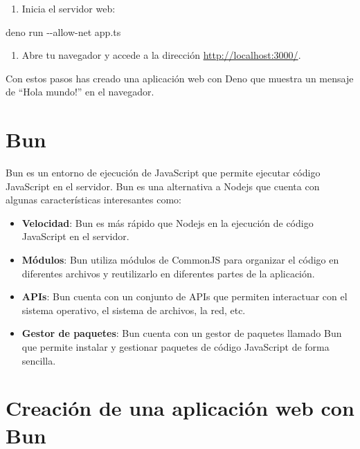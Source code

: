 \documentclass[
  a4paper,
  DIV=11,
  numbers=noendperiod,
  onepage,
  openany]{scrreprt}
\newenvironment{Shaded}{\begin{snugshade}}{\end{snugshade}}
\newcommand{\AttributeTok}[1]{\textcolor[rgb]{0.40,0.45,0.13}{#1}}
\newcommand{\ExtensionTok}[1]{\textcolor[rgb]{0.00,0.23,0.31}{#1}}
\newcommand{\NormalTok}[1]{\textcolor[rgb]{0.00,0.23,0.31}{#1}}
\providecommand{\tightlist}{%
  \setlength{\itemsep}{0pt}\setlength{\parskip}{0pt}}\usepackage{longtable,booktabs,array}
\begin{document}
\begin{tcolorbox}
\begin{enumerate}
\def\labelenumi{\arabic{enumi}.}
\setcounter{enumi}{1}
\tightlist
\item
  Inicia el servidor web:
\end{enumerate}

\begin{Shaded}
\begin{Highlighting}[]
\ExtensionTok{deno}\NormalTok{ run }\AttributeTok{{-}{-}allow{-}net}\NormalTok{ app.ts}
\end{Highlighting}
\end{Shaded}

\begin{enumerate}
\def\labelenumi{\arabic{enumi}.}
\setcounter{enumi}{2}
\tightlist
\item
  Abre tu navegador y accede a la dirección
  \url{http://localhost:3000/}.
\end{enumerate}

Con estos pasos has creado una aplicación web con Deno que muestra un
mensaje de ``Hola mundo!'' en el navegador.

\section{Bun}\label{bun}

Bun es un entorno de ejecución de JavaScript que permite ejecutar código
JavaScript en el servidor. Bun es una alternativa a Nodejs que cuenta
con algunas características interesantes como:

\begin{itemize}
\item
  \textbf{Velocidad}: Bun es más rápido que Nodejs en la ejecución de
  código JavaScript en el servidor.
\item
  \textbf{Módulos}: Bun utiliza módulos de CommonJS para organizar el
  código en diferentes archivos y reutilizarlo en diferentes partes de
  la aplicación.
\item
  \textbf{APIs}: Bun cuenta con un conjunto de APIs que permiten
  interactuar con el sistema operativo, el sistema de archivos, la red,
  etc.
\item
  \textbf{Gestor de paquetes}: Bun cuenta con un gestor de paquetes
  llamado Bun que permite instalar y gestionar paquetes de código
  JavaScript de forma sencilla.
\end{itemize}

\section{Creación de una aplicación web con
Bun}\label{creaciuxf3n-de-una-aplicaciuxf3n-web-con-bun}


\end{tcolorbox}
\end{document}
